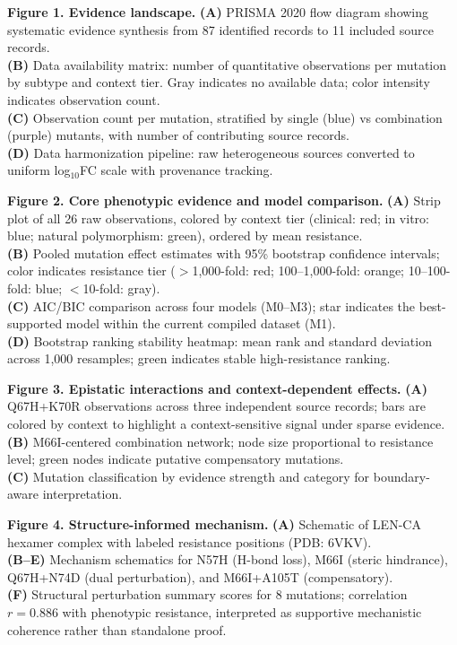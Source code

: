 \documentclass[preprint,authoryear]{elsarticle}
\begin{document}
\textbf{Figure 1. Evidence landscape.}
\textbf{(A)} PRISMA 2020 flow diagram showing systematic evidence synthesis from 87 identified records to 11 included source records.\\
\textbf{(B)} Data availability matrix: number of quantitative observations per mutation by subtype and context tier. Gray indicates no available data; color intensity indicates observation count.\\
\textbf{(C)} Observation count per mutation, stratified by single (blue) vs combination (purple) mutants, with number of contributing source records.\\
\textbf{(D)} Data harmonization pipeline: raw heterogeneous sources converted to uniform log$_{10}$FC scale with provenance tracking.

\textbf{Figure 2. Core phenotypic evidence and model comparison.}
\textbf{(A)} Strip plot of all 26 raw observations, colored by context tier (clinical: red; in vitro: blue; natural polymorphism: green), ordered by mean resistance.\\
\textbf{(B)} Pooled mutation effect estimates with 95\% bootstrap confidence intervals; color indicates resistance tier ($>$1,000-fold: red; 100--1,000-fold: orange; 10--100-fold: blue; $<$10-fold: gray).\\
\textbf{(C)} AIC/BIC comparison across four models (M0--M3); star indicates the best-supported model within the current compiled dataset (M1).\\
\textbf{(D)} Bootstrap ranking stability heatmap: mean rank and standard deviation across 1,000 resamples; green indicates stable high-resistance ranking.

\textbf{Figure 3. Epistatic interactions and context-dependent effects.}
\textbf{(A)} Q67H+K70R observations across three independent source records; bars are colored by context to highlight a context-sensitive signal under sparse evidence.\\
\textbf{(B)} M66I-centered combination network; node size proportional to resistance level; green nodes indicate putative compensatory mutations.\\
\textbf{(C)} Mutation classification by evidence strength and category for boundary-aware interpretation.

\textbf{Figure 4. Structure-informed mechanism.}
\textbf{(A)} Schematic of LEN-CA hexamer complex with labeled resistance positions (PDB: 6VKV).\\
\textbf{(B--E)} Mechanism schematics for N57H (H-bond loss), M66I (steric hindrance), Q67H+N74D (dual perturbation), and M66I+A105T (compensatory).\\
\textbf{(F)} Structural perturbation summary scores for 8 mutations; correlation $r=0.886$ with phenotypic resistance, interpreted as supportive mechanistic coherence rather than standalone proof.
\end{document}
